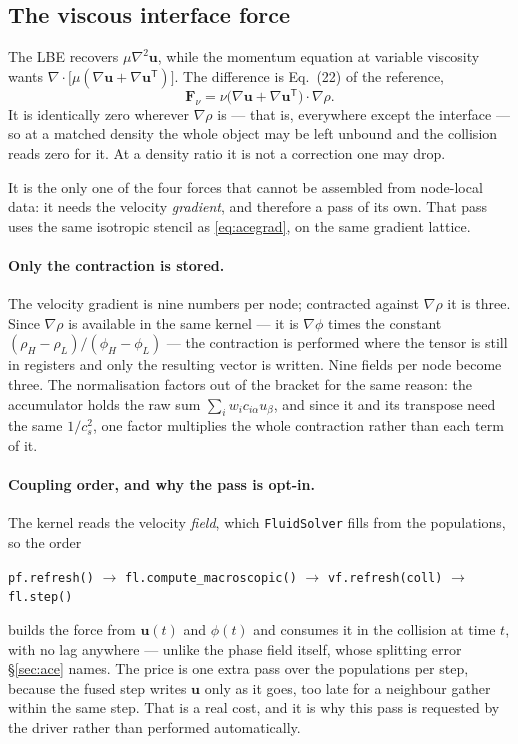 \documentclass[11pt,a4paper]{article}
\newcommand{\code}[1]{\texttt{\small #1}}
\newcommand{\cs}{c_s}
\newcommand{\uu}{\bm{u}}
\begin{document}
\subsection{The viscous interface force}
\label{sec:fnu}

The LBE recovers $\mu\nabla^2\uu$, while the momentum equation at variable
viscosity wants $\nabla\!\cdot\!\big[\mu(\nabla\uu+\nabla\uu^{\mathsf T})\big]$.
The difference is Eq.~(22) of the reference,
\begin{equation}
  \bm{F}_\nu = \nu\big(\nabla\uu + \nabla\uu^{\mathsf T}\big)\!\cdot\!\nabla\rho .
  \label{eq:fnu}
\end{equation}
It is identically zero wherever $\nabla\rho$ is --- that is, everywhere except
the interface --- so at a matched density the whole object may be left unbound
and the collision reads zero for it. At a density ratio it is not a correction
one may drop.

It is the only one of the four forces that cannot be assembled from node-local
data: it needs the velocity \emph{gradient}, and therefore a pass of its own.
That pass uses the same isotropic stencil as \eqref{eq:acegrad}, on the same
gradient lattice.

\paragraph{Only the contraction is stored.} The velocity gradient is nine numbers
per node; contracted against $\nabla\rho$ it is three. Since $\nabla\rho$ is
available in the same kernel --- it is $\nabla\phi$ times the constant
$(\rho_H-\rho_L)/(\phi_H-\phi_L)$ --- the contraction is performed where the
tensor is still in registers and only the resulting vector is written. Nine
fields per node become three. The normalisation factors out of the bracket for
the same reason: the accumulator holds the raw sum $\sum_i w_i c_{i\alpha}u_\beta$,
and since it and its transpose need the same $1/\cs^2$, one factor multiplies the
whole contraction rather than each term of it.

\paragraph{Coupling order, and why the pass is opt-in.} The kernel reads the
velocity \emph{field}, which \code{FluidSolver} fills from the populations, so
the order
\begin{center}\small
\code{pf.refresh()} $\rightarrow$ \code{fl.compute\_macroscopic()} $\rightarrow$
\code{vf.refresh(coll)} $\rightarrow$ \code{fl.step()}
\end{center}
builds the force from $\uu(t)$ and $\phi(t)$ and consumes it in the collision at
time $t$, with no lag anywhere --- unlike the phase field itself, whose splitting
error \S\ref{sec:ace} names. The price is one extra pass over the populations per
step, because the fused step writes $\uu$ only as it goes, too late for a
neighbour gather within the same step. That is a real cost, and it is why this
pass is requested by the driver rather than performed automatically.
\end{document}
